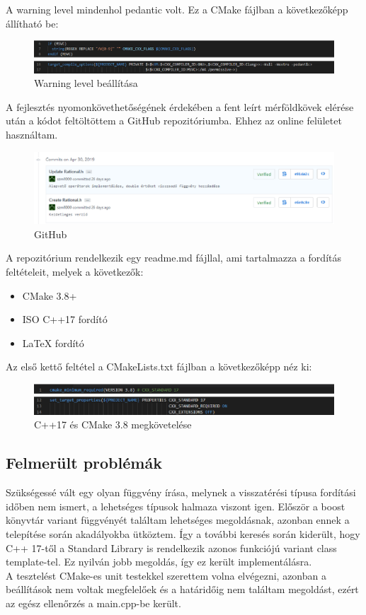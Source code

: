 \documentclass[a4paper, 12pt]{article}
\begin{document}
A warning level mindenhol pedantic volt. Ez a CMake fájlban a következőképp állítható be:
\\
\begin{figure}[!h]
\includegraphics[width=1\textwidth]{cmake3.eps}
\caption{Warning level beállítása}
\end{figure}


A fejlesztés nyomonkövethetőségének érdekében a fent leírt mérföldkövek elérése után a kódot feltöltöttem a GitHub repozitóriumba. Ehhez az online felületet használtam.

\begin{figure}[!h]
\centering
\includegraphics[width=1\textwidth]{github.eps}
\caption{GitHub}
\end{figure}

A repozitórium rendelkezik egy readme.md fájllal, ami tartalmazza a fordítás feltételeit, melyek a következők:
\begin{itemize}
    \item CMake 3.8+
    \item ISO C++17 fordító
    \item LaTeX fordító
\end{itemize}

Az első kettő feltétel a CMakeLists.txt fájlban a következőképp néz ki:
\begin{figure}[h!]
\includegraphics[width=1\textwidth]{cmake2.eps}
\caption{C++17 és CMake 3.8 megkövetelése}
\end{figure}

\subsection*{Felmerült problémák}
\indent
Szükségessé vált egy olyan függvény írása, melynek a visszatérési típusa fordítási időben nem ismert, a  lehetséges típusok halmaza viszont igen. Először a boost könyvtár variant függvényét találtam lehetséges megoldásnak, azonban ennek a telepítése során akadályokba ütköztem. Így a további keresés során kiderült, hogy C++ 17-től a Standard Library is rendelkezik azonos funkciójú variant class template-tel. Ez nyilván jobb megoldás, így ez került implementálásra.
\\
\indent
A tesztelést CMake-es unit testekkel szerettem volna elvégezni, azonban a beállítások nem voltak megfelelőek és a határidőig nem találtam megoldást, ezért az egész ellenőrzés a main.cpp-be került.
\end{document}
